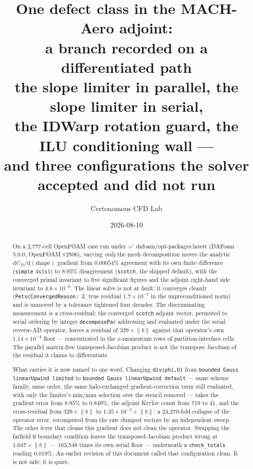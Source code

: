 \documentclass[11pt,a4paper]{article}
\title{\bfseries One defect class in the MACH-Aero adjoint:\\
a branch recorded on a differentiated path\\
\large the slope limiter in parallel, the slope limiter in serial,\\
the IDWarp rotation guard, the ILU conditioning wall ---\\
and three configurations the solver accepted and did not run}
\author{Certonomous CFD Lab}
\date{2026-08-10}
\newcommand{\artifact}[1]{{\small\ttfamily\hyphenchar\font=`\-\relax
  \def\_{\textunderscore\allowbreak}#1}}
\begin{document}
\maketitle

\begin{abstract}
\noindent
On a 2{,}777-cell OpenFOAM case run under \artifact{dafoam/opt-packages:latest}
(DAFoam 5.0.0, OpenFOAM v2506), varying \emph{only} the mesh decomposition moves the
analytic \(\mathrm{d}C_D/\mathrm{d}(\mathrm{shape})\) gradient from
\(0.00054\%\) agreement with its own finite difference (\texttt{simple} 4x1x1) to
\(8.95\%\) disagreement (\texttt{scotch}, the shipped default), with the converged primal
invariant to five significant figures and the adjoint right-hand side invariant to
\(4.8\times10^{-6}\). The linear solve is not at fault: it converges cleanly
(\texttt{PetscConvergedReason: 2}, true residual \(1.7\times10^{-7}\) in the
unpreconditioned norm) and is unmoved by a tolerance tightened four decades. The
discriminating measurement is a cross-residual: the converged \texttt{scotch} adjoint
vector, permuted to serial ordering by integer \texttt{decomposePar} addressing and
evaluated under the serial reverse-AD operator, leaves a residual of \(329\times\lVert
b\rVert\) against that operator's own \(1.14\times10^{-4}\) floor --- concentrated in the
\(x\)-momentum rows of partition-interface cells. The parallel matrix-free
transposed-Jacobian product is not the transpose Jacobian of the residual it claims to
differentiate.

What carries it is now named to one word. Changing \texttt{div(phi,U)} from
\texttt{bounded Gauss linearUpwind limited} to \texttt{bounded Gauss linearUpwind default}
--- same scheme family, same order, the same halo-exchanged gradient-correction term still
evaluated, with only the limiter's min/max selection over the stencil removed --- takes the
gradient error from \(8.95\%\) to \(0.849\%\), the adjoint Krylov count from 719 to 41, and
the cross-residual from \(329\times\lVert b\rVert\) to
\(1.35\times10^{-2}\times\lVert b\rVert\): a 24{,}270-fold collapse of the operator error,
recomputed from the raw dumped vectors by an independent sweep. The other lever that cleans
this gradient does not clean the operator. Swapping the farfield \texttt{U} boundary
condition leaves the transposed-Jacobian product wrong at \(1.047\times\lVert b\rVert\) ---
163{,}548 times its own serial floor --- underneath a \texttt{check\_totals} reading
\(0.019\%\). An earlier revision of this document called that configuration clean. It is not
safe; it is quiet.


\end{abstract}
\end{document}
